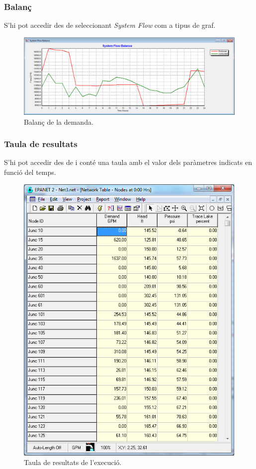 \documentclass[12pt]{article}
\begin{document}
\pagebreak
\subsubsection{Balanç}
S'hi pot accedir des de  seleccionant \textit{System Flow} com a tipus de graf.
\begin{figure}[h!]
	\centering
	\includegraphics[scale=.5]{imatges/epanet/reports/balans.png}
	\caption{Balanç de la demanda.}
\end{figure}

\subsubsection{Taula de resultats}
S'hi pot accedir des de  i conté una taula amb el valor dels paràmetres indicats en funció del temps.
\begin{figure}[h!]
	\centering
	\includegraphics[scale=.5]{imatges/epanet/reports/taula.png}
	\caption{Taula de resultats de l'execució.}
\end{figure}
\end{document}
